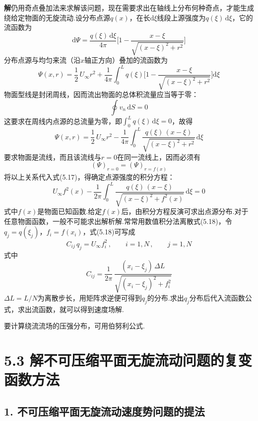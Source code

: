 \noindent\textbf{解}\quad 仍用奇点叠加法来求解该问题，现在需要求出在轴线上分布何种奇点，才能生成绕给定物面的无旋流动.设分布点源$q(x)$，在长$\mathrm{d}\xi$线段上源强度为$q(\xi)\,\mathrm{d}\xi$，它的流函数为
\[
\mathrm{d}\Psi=\frac{q(\xi)\,\mathrm{d}\xi}{4\pi}\bigg[1-\frac{x-\xi}{\sqrt{(x-\xi)^{2}+r^{2}}}\bigg]
\]
分布点源与均匀来流（沿$x$轴正方向）叠加的流函数为
\[
\Psi(x,r)=\frac{1}{2}\,U_\infty r^{2}+\frac{1}{4\pi}\int_0^{L}q(\xi)\bigg[1-\frac{x-\xi}{\sqrt{(x-\xi)^{2}+r^{2}}}\bigg]\mathrm{d}\xi
\]
物面型线是封闭周线，因而流出物面的总体积流量应当等于零：
\[
\oint v_n\,\mathrm{d}S=0
\]
这要求在周线内点源的总流量为零，即$\displaystyle\int_0^{L}q(\xi)\,\mathrm{d}\xi=0$，故得
\begin{equation*}
\Psi(x,r)=\frac{1}{2}\,U_\infty r^{2}-\frac{1}{4\pi}\int_0^{L}\frac{q(\xi)\,(x-\xi)}{\sqrt{(x-\xi)^{2}+r^{2}}}\,\mathrm{d}\xi
\tag{5.17}
\end{equation*}
要求物面是流线，而且该流线与$r=0$在同一流线上，因而必须有
\[
(\Psi)_{r=0}=(\Psi)_{r=f(x)}
\]
将以上关系代入式(5.17)，得确定点源强度的积分方程：
\begin{equation*}
U_\infty f^{2}(x)-\frac{1}{2\pi}\int_0^{L}\frac{q(\xi)\,(x-\xi)}{\sqrt{(x-\xi)^{2}+f^{2}(x)}}\,\mathrm{d}\xi=0
\tag{5.18}
\end{equation*}
式中$f(x)$是物面已知函数.给定$f(x)$后，由积分方程反演可求出点源分布.对于任意物面函数，一般不可能求出解析解.常常用数值积分法离散式(5.18)，令$q_j=q(\xi_j)$，$f_i=f(x_i)$，式(5.18)可写成
\begin{equation*}
C_{ij}\,q_j=U_\infty f_i^{2}\,,\qquad i=1,N\,,\qquad j=1,N
\tag{5.19}
\end{equation*}
式中
\begin{equation*}
C_{ij}=\frac{1}{2\pi}\,\frac{(x_i-\xi_j)\,\Delta L}{\sqrt{(x_i-\xi_j)^{2}+f_i^{2}}}
\tag{5.20}
\end{equation*}
$\Delta L=L/N$为离散步长，用矩阵求逆便可得到$q_j$的分布.求出$q_j$分布后代入流函数公式，求出流函数，就可以得到速度场解.

要计算绕流流场的压强分布，可用伯努利公式.

\section*{5.3  解不可压缩平面无旋流动问题的复变函数方法}

\subsection*{1. 不可压缩平面无旋流动速度势问题的提法}

